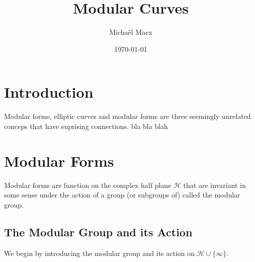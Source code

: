 \documentclass[a4paper]{article}
\author{Micha\"el Maex}
\date{\today}
\title{Modular Curves}
\theoremstyle{theoremdd}
\theoremstyle{definitiondd}
\theoremstyle{remarkdd}
\begin{document}
\maketitle

\bigskip

\tableofcontents

\pagebreak

\section{Introduction}

Modular forms, elliptic curves and modular forms are three seemingly unrelated conceps that have suprising connections. bla bla blah

\section{Modular Forms}
Modular forms are function on the complex half plane $\mathcal{H} $ that are invariant in some sense under the action of a group (or subgroups of) called the modular group.

\subsection{The Modular Group and its Action}
We begin by introducing the modular group and its action on $\mathcal{H} \cup \{\infty\} $.  
\end{document}
